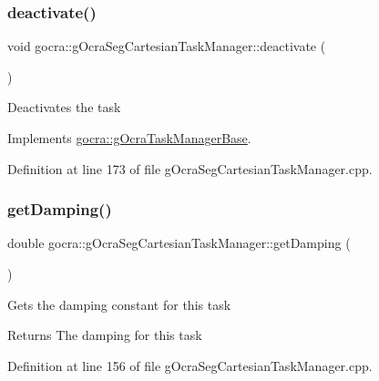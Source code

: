 \subsubsection{\texorpdfstring{deactivate()}{deactivate()}}
{\footnotesize\ttfamily void gocra\+::g\+Ocra\+Seg\+Cartesian\+Task\+Manager\+::deactivate (\begin{DoxyParamCaption}{ }\end{DoxyParamCaption})\hspace{0.3cm}{\ttfamily [virtual]}}

Deactivates the task 

Implements \hyperlink{classgocra_1_1gOcraTaskManagerBase_a7cf9111e69aee47a39fe0f2976a20d6c}{gocra\+::g\+Ocra\+Task\+Manager\+Base}.



Definition at line 173 of file g\+Ocra\+Seg\+Cartesian\+Task\+Manager.\+cpp.

\hypertarget{classgocra_1_1gOcraSegCartesianTaskManager_a67ab6c84e7b6739b777f53bf31c88fb1}{}\label{classgocra_1_1gOcraSegCartesianTaskManager_a67ab6c84e7b6739b777f53bf31c88fb1} 
\subsubsection{\texorpdfstring{get\+Damping()}{getDamping()}}
{\footnotesize\ttfamily double gocra\+::g\+Ocra\+Seg\+Cartesian\+Task\+Manager\+::get\+Damping (\begin{DoxyParamCaption}{ }\end{DoxyParamCaption})}

Gets the damping constant for this task

\begin{DoxyReturn}{Returns}
The damping for this task 
\end{DoxyReturn}


Definition at line 156 of file g\+Ocra\+Seg\+Cartesian\+Task\+Manager.\+cpp.

\hypertarget{classgocra_1_1gOcraSegCartesianTaskManager_ab94deae9c9d90f78bf706d7bdc2fe5cb}{}\label{classgocra_1_1gOcraSegCartesianTaskManager_ab94deae9c9d90f78bf706d7bdc2fe5cb} 
